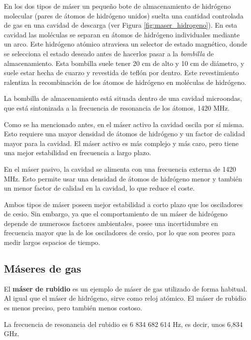 En los dos tipos de m\'aser un peque\~no bote de almacenamiento de hidr\'ogeno molecular (pares de \'atomos de hidr\'ogeno unidos) suelta una cantidad controlada de gas en una cavidad de descarga (ver Figura \ref{fig:maser_hidrogeno}). En esta cavidad las mol\'eculas se separan en \'atomos de hidr\'ogeno individuales mediante un arco. Este hidr\'ogeno at\'omico atraviesa un selector de estado magn\'etico, donde se selecciona el estado deseado antes de hacerlos pasar a la \textit{bombilla} de almacenamiento. Esta bombilla suele tener 20 cm de alto y 10 cm de di\'ametro, y suele estar hecha de cuarzo y revestida de tefl\'on por dentro. Este revestimiento ralentiza la recombinaci\'on de los \'atomos de hidr\'ogeno en mol\'eculas de hidr\'ogeno. 

La bombilla de almacenamiento est\'a situada dentro de una cavidad microondas, que est\'a sintonizada a la frecuencia de resonancia de los \'atomos, 1420 MHz.

Como se ha mencionado antes, en el m\'aser activo la cavidad oscila por s\'i misma. Esto requiere una mayor densidad de \'atomos de hidr\'ogeno y un factor de calidad mayor para la cavidad. El m\'aser activo es m\'as complejo y m\'as caro, pero tiene una mejor estabilidad en frecuencia a largo plazo.

En el m\'aser pasivo, la cavidad se alimenta con una frecuencia externa de 1420 MHz. Esto permite usar una densidad de \'atomos de hidr\'ogeno menor y tambi\'en un menor factor de calidad en la cavidad, lo que reduce el coste.

Ambos tipos de m\'aser poseen mejor estabilidad a corto plazo que los osciladores de cesio. Sin embargo, ya que el comportamiento de un m\'aser de hidr\'ogeno depende de numerosos factores ambientales, posee una incertidumbre en frecuencia mayor que la de los osciladores de cesio, por lo que son peores para medir largos espacios de tiempo.

\subsection{M\'aseres de gas}

El \textbf{m\'aser de rubidio} \cite{rubidium} es un ejemplo de m\'aser de gas utilizado de forma habitual. Al igual que el m\'aser de hidr\'ogeno, sirve como reloj at\'omico. El m\'aser de rubidio es menos preciso, pero tambi\'en menos costoso.

La frecuencia de resonancia del rubidio es 6 834 682 614 Hz, es decir, unos 6,834 GHz. 


